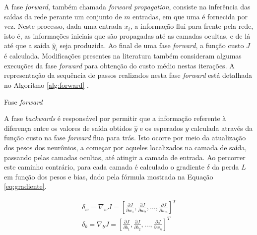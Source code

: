 A fase \emph{forward}, também chamada \emph{forward propagation}, consiste na inferência das saídas da rede perante um conjunto de $m$ entradas, em que uma é fornecida por vez. Neste processo, dada uma entrada $x_i$, a informação flui para frente  pela rede, isto é, as informações iniciais que são propagadas até as camadas ocultas, e de lá até que a saída $\hat{y}_i$ seja produzida. Ao final de uma fase \emph{forward}, a função custo $J$ é calculada. Modificações presentes na literatura também consideram algumas execuções da fase \emph{forward} para obtenção do custo médio nestas iterações. A representação da sequência de passos realizados nesta fase \emph{forward} está detalhada no Algoritmo \ref{alg:forward} \cite{haykin2009neural, goodfellow2016deep}.

\begin{algorithm}
	\caption{Fase \emph{forward}}\label{alg:forward}
\end{algorithm}

A fase \emph{backwards} é responsável por permitir que a informação referente à diferença entre os valores de saída obtidos $\hat{y}$ e os esperados $y$ calculada através da função custo na fase \emph{forward} flua para trás. Isto ocorre por meio da atualização dos pesos dos neurônios, a começar por aqueles localizados na camada de saída, passando pelas camadas ocultas, até atingir a camada de entrada. Ao percorrer este caminho contrário, para cada camada é calculado o gradiente $\delta$ da perda $L$ em função dos pesos e bias, dado pela fórmula mostrada na Equação \ref{eq:gradiente}.

\begin{gather}\label{eq:gradiente}
	\delta_w = \nabla_{w} J = \left[
							\frac{\partial J}{\partial w_1}, \frac{\partial J}{\partial w_2}, \ldots, \frac{\partial J}{\partial w_n}
						\right]^T\\
	\delta_b = \nabla_{b} J = \left[
							\frac{\partial J}{\partial b_1}, \frac{\partial J}{\partial b_2}, \ldots, \frac{\partial J}{\partial w_n}
						\right]^T
\end{gather}

